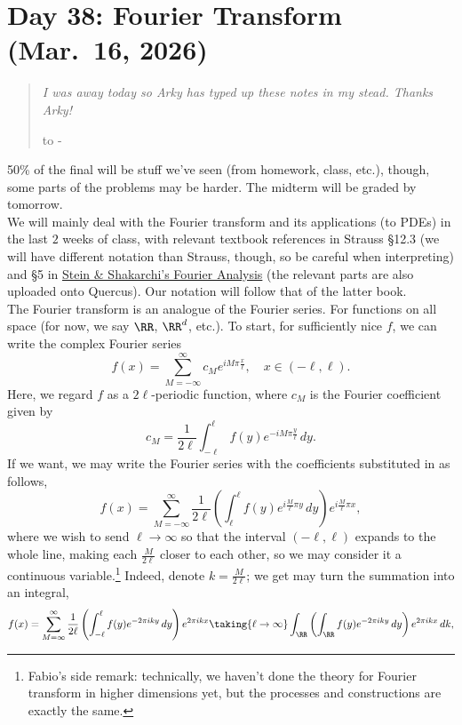 \section{Day 38: Fourier Transform (Mar.\ 16, 2026)}
\begin{quote}
	\textit{I was away today so Arky has typed up these notes in my stead. Thanks Arky!}

	\hbox to \dimexpr\textwidth - \parindent{}
\end{quote}

50\% of the final will be stuff we've seen (from homework, class, etc.), though, some parts of the problems may be harder. The midterm will be graded by tomorrow.
\\[8pt]
We will mainly deal with the Fourier transform and its applications (to PDEs) in the last $2$ weeks of class, with relevant textbook references in Strauss \S12.3 (we will have different notation than Strauss, though, so be careful when interpreting) and \S5 in \href{https://kryakin.site/am2/Stein-Shakarchi-1-Fourier_Analysis.pdf}{Stein \& Shakarchi's Fourier Analysis} (the relevant parts are also uploaded onto Quercus). Our notation will follow that of the latter book.
\\[8pt]
The Fourier transform is an analogue of the Fourier series. For functions on all space (for now, we say $\RR$, $\RR^d$, etc.). To start, for sufficiently nice $f$, we can write the complex Fourier series
\[ f(x) = \sum_{M = -\infty}^\infty c_M e^{i M \pi \frac{x}{\ell}}, \quad x \in (-\ell, \ell). \]
Here, we regard $f$ as a $2\ell$-periodic function, where $c_M$ is the Fourier coefficient given by
\[ c_M = \frac{1}{2\ell} \int_{-\ell}^\ell f(y) e^{-i M \pi \frac{y}{\ell}} \, dy. \]
If we want, we may write the Fourier series with the coefficients substituted in as follows,
\[ f(x) = \sum_{M=-\infty}^\infty \frac{1}{2\ell} \left(\int_{\ell}^\ell f(y) e^{i \frac{M}{\ell} \pi y} \, dy\right) e^{i \frac{M}{\ell} \pi x}, \]
where we wish to send $\ell \to \infty$ so that the interval $(-\ell, \ell)$ expands to the whole line, making each $\frac{M}{2\ell}$ closer to each other, so we may consider it a continuous variable.\footnote{Fabio's side remark: technically, we haven't done the theory for Fourier transform in higher dimensions yet, but the processes and constructions are exactly the same.} Indeed, denote $k = \frac{M}{2\ell}$; we get may turn the summation into an integral,
\[ f(x) = \sum_{M=\infty}^\infty \frac{1}{2\ell} \left(\int_{-\ell}^\ell f(y) e^{-2\pi i k y} \, dy\right) e^{2\pi i k x} \taking{\ell \to \infty} \int_{\RR} \left(\int_{\RR} f(y) e^{-2\pi i k y} \, dy\right) e^{2\pi i k x} \, dk, \]
